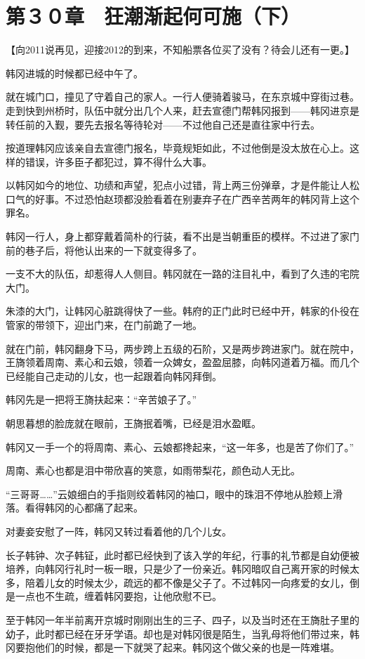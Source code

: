 \section{第３０章　狂潮渐起何可施（下）}

【向2011说再见，迎接2012的到来，不知船票各位买了没有？待会儿还有一更。】

韩冈进城的时候都已经中午了。

就在城门口，撞见了守着自己的家人。一行人便骑着骏马，在东京城中穿街过巷。走到快到州桥时，队伍中就分出几个人来，赶去宣德门帮韩冈报到——韩冈进京是转任前的入觐，要先去报名等待轮对——不过他自己还是直往家中行去。

按道理韩冈应该亲自去宣德门报名，毕竟规矩如此，不过他倒是没太放在心上。这样的错误，许多臣子都犯过，算不得什么大事。

以韩冈如今的地位、功绩和声望，犯点小过错，背上两三份弹章，才是件能让人松口气的好事。不过恐怕赵顼都没脸看着在别妻弃子在广西辛苦两年的韩冈背上这个罪名。

韩冈一行人，身上都穿戴着简朴的行装，看不出是当朝重臣的模样。不过进了家门前的巷子后，将他认出来的一下就变得多了。

一支不大的队伍，却惹得人人侧目。韩冈就在一路的注目礼中，看到了久违的宅院大门。

朱漆的大门，让韩冈心脏跳得快了一些。韩府的正门此时已经中开，韩家的仆役在管家的带领下，迎出门来，在门前跪了一地。

就在门前，韩冈翻身下马，两步跨上五级的石阶，又是两步跨进家门。就在院中，王旖领着周南、素心和云娘，领着一众婢女，盈盈屈膝，向韩冈道着万福。而几个已经能自己走动的儿女，也一起跟着向韩冈拜倒。

韩冈先是一把将王旖扶起来：“辛苦娘子了。”

朝思暮想的脸庞就在眼前，王旖抿着嘴，已经是泪水盈眶。

韩冈又一手一个的将周南、素心、云娘都搀起来，“这一年多，也是苦了你们了。”

周南、素心也都是泪中带欣喜的笑意，如雨带梨花，颜色动人无比。

“三哥哥……”云娘细白的手指则绞着韩冈的袖口，眼中的珠泪不停地从脸颊上滑落。看得韩冈的心都痛了起来。

对妻妾安慰了一阵，韩冈又转过看着他的几个儿女。

长子韩钟、次子韩钲，此时都已经快到了该入学的年纪，行事的礼节都是自幼便被培养，向韩冈行礼时一板一眼，只是少了一份亲近。韩冈暗叹自己离开家的时候太多，陪着儿女的时候太少，疏远的都不像是父子了。不过韩冈一向疼爱的女儿，倒是一点也不生疏，缠着韩冈要抱，让他欣慰不已。

至于韩冈一年半前离开京城时刚刚出生的三子、四子，以及当时还在王旖肚子里的幼子，此时都已经在牙牙学语。却也是对韩冈很是陌生，当乳母将他们带过来，韩冈要抱他们的时候，都是一下就哭了起来。韩冈这个做父亲的也是一阵难堪。


